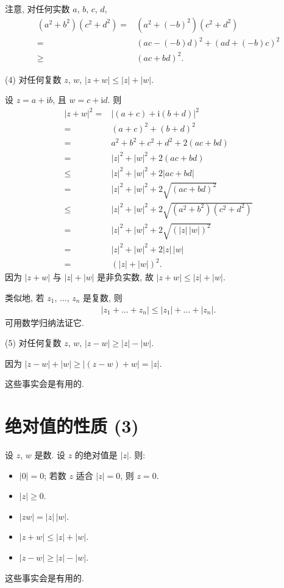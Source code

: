 \documentclass[../libro.tex]{subfiles}
\begin{document}
注意, 对任何实数 \(a\), \(b\), \(c\), \(d\),
\begin{align*}
    (a^2 + b^2) (c^2 + d^2)
    = {}    & (a^2 + (-b)^2) (c^2 + d^2)      \\
    = {}    & (ac - (-b)d)^2 + (ad + (-b)c)^2 \\
    \geq {} & (ac + bd)^2.
\end{align*}

(4)
对任何复数 \(z\), \(w\), \(|{z + w}| \leq |z| + |w|\).

设 \(z = a + \mathrm{i} b\), 且 \(w = c + \mathrm{i} d\).
则
\begin{align*}
    |{z + w}|^2
    = {}    & |{(a + c) + \mathrm{i} (b + d)}|^2    \\
    = {}    & (a + c)^2 + (b + d)^2                 \\
    = {}    & a^2 + b^2 + c^2 + d^2 + 2(ac + bd)    \\
    = {}    & |z|^2 + |w|^2 + 2(ac + bd)            \\
    \leq {} & |z|^2 + |w|^2 + 2|{ac + bd}|          \\
    = {}    & |z|^2 + |w|^2 + 2 \sqrt{(ac + bd)^2}  \\
    \leq {} & |z|^2 + |w|^2
    + 2 \sqrt{(a^2 + b^2) (c^2 + d^2)}              \\
    = {}    & |z|^2 + |w|^2 + 2 \sqrt{(|z|\,|w|)^2} \\
    = {}    & |z|^2 + |w|^2 + 2 |z|\, |w|           \\
    = {}    & (|z| + |w|)^2.
\end{align*}
因为 \(|{z + w}|\) 与 \(|z| + |w|\) 是非负实数,
故 \(|{z + w}| \leq |z| + |w|\).

类似地, 若 \(z_1\), \(\dots\), \(z_n\) 是复数, 则
\begin{align*}
    |{z_1 + \dots + z_n}| \leq |z_1| + \dots + |z_n|.
\end{align*}
可用数学归纳法证它.

(5)
对任何复数 \(z\), \(w\), \(|{z - w}| \geq |z| - |w|\).

因为 \(|{z - w}| + |w| \geq |{(z - w) + w}| = |z|\).

\vspace{2ex}

这些事实会是有用的.

\section{绝对值的性质 (3)}

设 \(z\), \(w\) 是数.
设 \(z\) 的绝对值是 \(|z|\).
则:
\begin{itemize}
    \item \(|0| = 0\);
        若数 \(z\) 适合 \(|z| = 0\), 则 \(z = 0\).
    \item \(|z| \geq 0\).
    \item \(|zw| = |z|\, |w|\).
    \item \(|{z + w}| \leq |z| + |w|\).
    \item \(|{z - w}| \geq |z| - |w|\).
\end{itemize}
这些事实会是有用的.
\end{document}

